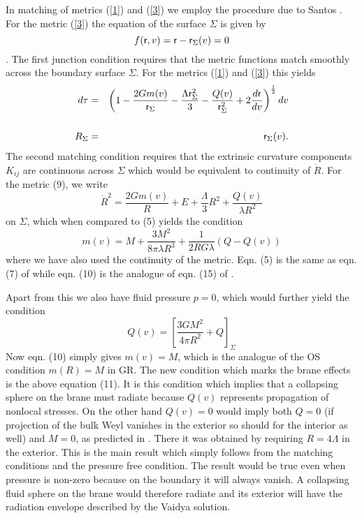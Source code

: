 \documentclass[a4paper,twocolumn,showpacs,preprintnumbers,amsmath,amssymb]{revtex4}
\begin{document}
In matching of metrics (\ref{1}) and (\ref{3}) we employ the procedure due to 
Santos \cite{san}.
For the metric (\ref{3}) the equation of the surface $\Sigma$ is given by
\[f({\sf r}, v) = {\sf r} - {\sf r}_{\Sigma}(v) = 0\].
The first junction condition requires that the metric functions match smoothly across the boundary surface $\Sigma$. 
For the metrics (\ref{1}) and (\ref{3}) this yields
\begin{eqnarray*} 
d\tau &=& \left(1  -\frac{2Gm(v)}{{\sf r}_{\Sigma}} - \frac{\Lambda{\sf r}_{\Sigma}^2}{3} - \frac{Q(v)}{{\sf r}_{\Sigma}^2} + 2\frac{d{\sf r}}{dv}\right)^{\frac{1}{2}} dv \label{333a}\\ \nonumber \\
R_{\Sigma} &=& {\sf r}_{\Sigma}(v). \label{333b}
\end{eqnarray*}
The second matching condition requires that the extrinsic curvature components $K_{ij}$ are continuous across $\Sigma$ which would be equivalent to continuity 
of $\dot R$. For the metric (9), we write 
\[{\dot R}^2 = \frac{2Gm(v)}{R} + E + \frac{\Lambda}{3}R^2 + \frac{Q(v)}{\lambda R^2} \]
on $\Sigma$, 
which when compared to (5) yields the condition
\begin{equation}
m(v) = M + \frac{3M^2}{8\pi \lambda R^3} + \frac{1}{2RG\lambda}\left(Q - Q(v)\right) \label{555a} \end{equation}
where we have also used the continuity of the metric. Eqn. (5) is the same as 
eqn. (7) of \cite{r} while eqn. (10) is the analogue of eqn. (15) of \cite{r}.


Apart from this we also have fluid pressure $p = 0$, which would further 
yield the condition
\begin{equation} Q(v) = \left[\frac{3GM^2}{4\pi R^2} + Q \right]_{\Sigma} \label{555b}\end{equation}
Now eqn. (10) simply gives $m(v) = M$, which is the analogue of the 
OS condition $m(R) = M$ in GR. The new condition which marks the brane effects is the above equation (11). It is this condition which implies that a collapsing sphere on the brane 
must radiate because $Q(v)$ represents propagation of nonlocal stresses. On 
the other hand $Q(v) = 0$ would imply both $Q = 0$ (if projection of the bulk 
Weyl vanishes in the exterior so should for the interior as well) and $M = 0$,
as predicted in \cite{r}. There it was obtained by requiring $R = 4\Lambda$ 
in the exterior. This is the main result which simply follows from 
the matching conditions and the pressure free condition. The result would 
be true even when pressure is non-zero because on the boundary it will always 
vanish. A collapsing fluid sphere on the brane would therefore radiate and its
exterior will have the radiation envelope described by the Vaidya 
solution.
\end{document}
